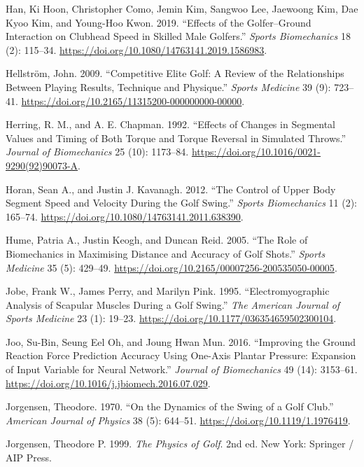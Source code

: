\documentclass[
  letterpaper,
]{report}
\newlength{\cslhangindent}
\newenvironment{CSLReferences}[2] %
 {\begin{list}{}{%
  \setlength{\itemindent}{0pt}
  \setlength{\leftmargin}{0pt}
  \setlength{\parsep}{0pt}
  \ifodd #1
   \setlength{\leftmargin}{\cslhangindent}
   \setlength{\itemindent}{-1\cslhangindent}
  \fi
  \setlength{\itemsep}{#2\baselineskip}}}
 {\end{list}}
\begin{document}
\begin{CSLReferences}{1}{0}
Han, Ki Hoon, Christopher Como, Jemin Kim, Sangwoo Lee, Jaewoong Kim,
Dae Kyoo Kim, and Young-Hoo Kwon. 2019. {``Effects of the Golfer--Ground
Interaction on Clubhead Speed in Skilled Male Golfers.''} \emph{Sports
Biomechanics} 18 (2): 115--34.
\url{https://doi.org/10.1080/14763141.2019.1586983}.

Hellström, John. 2009. {``Competitive Elite Golf: A Review of the
Relationships Between Playing Results, Technique and Physique.''}
\emph{Sports Medicine} 39 (9): 723--41.
\url{https://doi.org/10.2165/11315200-000000000-00000}.

Herring, R. M., and A. E. Chapman. 1992. {``Effects of Changes in
Segmental Values and Timing of Both Torque and Torque Reversal in
Simulated Throws.''} \emph{Journal of Biomechanics} 25 (10): 1173--84.
\url{https://doi.org/10.1016/0021-9290(92)90073-A}.

Horan, Sean A., and Justin J. Kavanagh. 2012. {``The Control of Upper
Body Segment Speed and Velocity During the Golf Swing.''} \emph{Sports
Biomechanics} 11 (2): 165--74.
\url{https://doi.org/10.1080/14763141.2011.638390}.

Hume, Patria A., Justin Keogh, and Duncan Reid. 2005. {``The Role of
Biomechanics in Maximising Distance and Accuracy of Golf Shots.''}
\emph{Sports Medicine} 35 (5): 429--49.
\url{https://doi.org/10.2165/00007256-200535050-00005}.

Jobe, Frank W., James Perry, and Marilyn Pink. 1995.
{``Electromyographic Analysis of Scapular Muscles During a Golf
Swing.''} \emph{The American Journal of Sports Medicine} 23 (1): 19--23.
\url{https://doi.org/10.1177/036354659502300104}.

Joo, Su-Bin, Seung Eel Oh, and Joung Hwan Mun. 2016. {``Improving the
Ground Reaction Force Prediction Accuracy Using One-Axis Plantar
Pressure: Expansion of Input Variable for Neural Network.''}
\emph{Journal of Biomechanics} 49 (14): 3153--61.
\url{https://doi.org/10.1016/j.jbiomech.2016.07.029}.

Jorgensen, Theodore. 1970. {``On the Dynamics of the Swing of a Golf
Club.''} \emph{American Journal of Physics} 38 (5): 644--51.
\url{https://doi.org/10.1119/1.1976419}.

Jorgensen, Theodore P. 1999. \emph{The Physics of Golf}. 2nd ed. New
York: Springer / AIP Press.


\end{CSLReferences}
\end{document}
